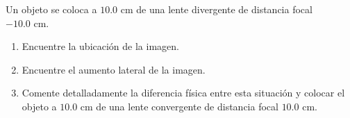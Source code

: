 \item Un objeto se coloca a $10.0\text{ cm}$ de una lente divergente de distancia focal $-10.0\text{ cm}$.
\begin{enumerate}
    \item Encuentre la ubicación de la imagen.
    \item Encuentre el aumento lateral de la imagen.
    \item Comente detalladamente la diferencia física entre esta situación y colocar el objeto a $10.0\text{ cm}$ de una lente convergente de distancia focal $10.0\text{ cm}$.
\end{enumerate}